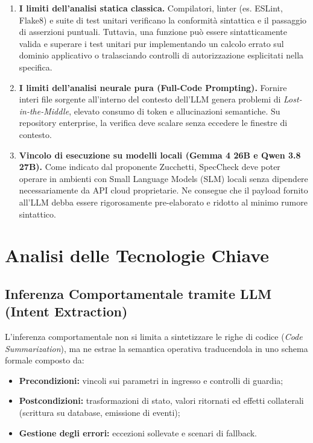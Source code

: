 \documentclass[a4paper, 11pt]{article}
\begin{document}
\begin{enumerate}
    \item \textbf{I limiti dell'analisi statica classica.} Compilatori, linter (es. ESLint, Flake8) e suite di test unitari verificano la conformità sintattica e il passaggio di asserzioni puntuali. Tuttavia, una funzione può essere sintatticamente valida e superare i test unitari pur implementando un calcolo errato sul dominio applicativo o tralasciando controlli di autorizzazione esplicitati nella specifica.
    \item \textbf{I limiti dell'analisi neurale pura (Full-Code Prompting).} Fornire interi file sorgente all'interno del contesto dell'LLM genera problemi di \textit{Lost-in-the-Middle}, elevato consumo di token e allucinazioni semantiche. Su repository enterprise, la verifica deve scalare senza eccedere le finestre di contesto.
    \item \textbf{Vincolo di esecuzione su modelli locali (Gemma 4 26B e Qwen 3.8 27B).} Come indicato dal proponente Zucchetti, SpecCheck deve poter operare in ambienti con Small Language Models (SLM) locali senza dipendere necessariamente da API cloud proprietarie. Ne consegue che il payload fornito all'LLM debba essere rigorosamente pre-elaborato e ridotto al minimo rumore sintattico.
\end{enumerate}


\section{Analisi delle Tecnologie Chiave}

\subsection{Inferenza Comportamentale tramite LLM (Intent Extraction)}
L'inferenza comportamentale non si limita a sintetizzare le righe di codice (\textit{Code Summarization}), ma ne estrae la semantica operativa traducendola in uno schema formale composto da:

\begin{itemize}
    \item \textbf{Precondizioni:} vincoli sui parametri in ingresso e controlli di guardia;
    \item \textbf{Postcondizioni:} trasformazioni di stato, valori ritornati ed effetti collaterali (scrittura su database, emissione di eventi);
    \item \textbf{Gestione degli errori:} eccezioni sollevate e scenari di fallback.
\end{itemize}
\end{document}
